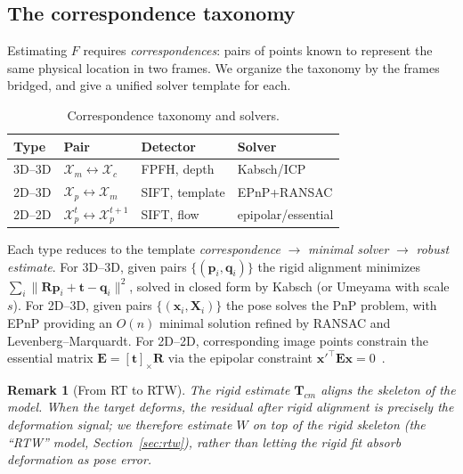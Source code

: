 \documentclass[9pt,twoside,web]{ieeecolor2}
\newtheorem{remark}{Remark}
\begin{document}
\subsection{The correspondence taxonomy}\label{sec:corr}
Estimating $F$ requires \emph{correspondences}: pairs of points known to represent the same physical location in two frames. We organize the taxonomy by the frames bridged, and give a unified solver template for each.

\begin{table}[t]
\centering
\caption{Correspondence taxonomy and solvers.}
\label{tab:taxonomy}
\begin{tabular}{llll}
\toprule
Type & Pair & Detector & Solver \\
\midrule
3D--3D & $\mathcal{X}_{m}\!\leftrightarrow\!\mathcal{X}_{c}$ & FPFH, depth & Kabsch/ICP \\
2D--3D & $\mathcal{X}_{p}\!\leftrightarrow\!\mathcal{X}_{m}$ & SIFT, template & EPnP+RANSAC \\
2D--2D & $\mathcal{X}_{p}^{t}\!\leftrightarrow\!\mathcal{X}_{p}^{t+1}$ & SIFT, flow & epipolar/essential \\
\bottomrule
\end{tabular}
\end{table}

Each type reduces to the template \emph{correspondence} $\to$ \emph{minimal solver} $\to$ \emph{robust estimate}. For 3D--3D, given pairs $\{(\mathbf{p}_{i},\mathbf{q}_{i})\}$ the rigid alignment minimizes $\sum_{i}\|\mathbf{R}\mathbf{p}_{i}+\mathbf{t}-\mathbf{q}_{i}\|^{2}$, solved in closed form by Kabsch (or Umeyama with scale $s$). For 2D--3D, given pairs $\{(\mathbf{x}_{i},\mathbf{X}_{i})\}$ the pose solves the PnP problem, with EPnP providing an $O(n)$ minimal solution refined by RANSAC and Levenberg--Marquardt. For 2D--2D, corresponding image points constrain the essential matrix $\mathbf{E}=[\mathbf{t}]_{\times}\mathbf{R}$ via the epipolar constraint $\mathbf{x}'^{\top}\mathbf{E}\mathbf{x}=0$~\cite{longuet1981,hartley2003mvg}.

\begin{remark}[From RT to RTW]
The rigid estimate $\mathbf{T}_{cm}$ aligns the \emph{skeleton} of the model. When the target deforms, the residual after rigid alignment is precisely the deformation signal; we therefore estimate $W$ on top of the rigid skeleton (the ``RTW'' model, Section~\ref{sec:rtw}), rather than letting the rigid fit absorb deformation as pose error.
\end{remark}
\end{document}
